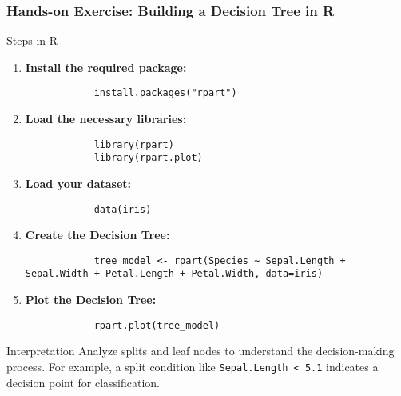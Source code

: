 \documentclass[aspectratio=169]{beamer}
\begin{document}
\begin{frame}[fragile]
    \frametitle{Hands-on Exercise: Building a Decision Tree in R}
    \begin{block}{Steps in R}
        \begin{enumerate}
            \item \textbf{Install the required package:} 
            \begin{lstlisting}
            install.packages("rpart")
            \end{lstlisting}

            \item \textbf{Load the necessary libraries:} 
            \begin{lstlisting}
            library(rpart)
            library(rpart.plot)
            \end{lstlisting}

            \item \textbf{Load your dataset:} 
            \begin{lstlisting}
            data(iris)
            \end{lstlisting}

            \item \textbf{Create the Decision Tree:} 
            \begin{lstlisting}
            tree_model <- rpart(Species ~ Sepal.Length + Sepal.Width + Petal.Length + Petal.Width, data=iris)
            \end{lstlisting}

            \item \textbf{Plot the Decision Tree:} 
            \begin{lstlisting}
            rpart.plot(tree_model)
            \end{lstlisting}
        \end{enumerate}
    \end{block}
    
    \begin{block}{Interpretation}
        Analyze splits and leaf nodes to understand the decision-making process. For example, a split condition like \texttt{Sepal.Length < 5.1} indicates a decision point for classification.
    \end{block}
\end{frame}
\end{document}
